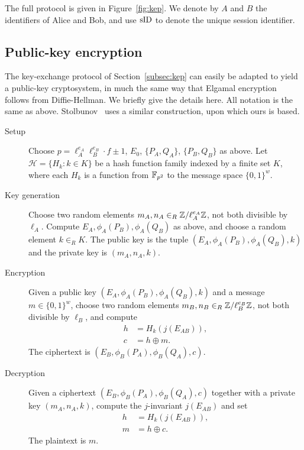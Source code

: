 The full protocol is given in Figure~\ref{fig:kep}. We denote by $A$
and $B$ the identifiers of Alice and Bob, and use $\operatorname{sID}$ to denote the
unique session identifier.

\subsection{Public-key encryption}\label{subsec:pk}

The key-exchange protocol of Section~\ref{subsec:kep} can easily be
adapted to yield a public-key cryptosystem, in much the same way that
Elgamal encryption follows from Diffie-Hellman. We briefly give the
details here. All notation is the same as above. Stolbunov~\cite{Stol}
uses a similar construction, upon which ours is based.

\begin{description}
\item[Setup] Choose $p = \ell_A^{e_A} \ell_B^{e_B} \cdot f \pm 1$,
  $E_0$, $\{P_A,Q_A\}$, $\{P_B,Q_B\}$ as above. Let $\mathcal{H} =
  \{H_k: k \in K\}$ be a hash function family indexed by a finite set
  $K$, where each $H_k$ is a function from ${\mathbb{F}}_{p^2}$ to the message
  space $\{0,1\}^w$.
\item[Key generation] Choose two random elements $m_A,n_A \in_R
{\mathbb{Z}}/\ell_A^{e_A}{\mathbb{Z}}$, not both divisible by $\ell_A$. Compute $E_A,
\phi_A(P_B), \phi_A(Q_B)$ as above, and choose a random element $k
\in_R K$. The public key is the tuple $(E_A, \phi_A(P_B), \phi_A(Q_B), k)$ and
the private key is $(m_A,n_A,k)$.
\item[Encryption] Given a public key $(E_A, \phi_A(P_B), \phi_A(Q_B),
  k)$ and a message $m \in \{0,1\}^w$, choose two random elements
  $m_B,n_B \in_R {\mathbb{Z}}/\ell_B^{e_B}{\mathbb{Z}}$, not both divisible by $\ell_B$,
  and compute
\begin{align*}
h &= H_k(j(E_{AB})), \\
c &= h \oplus m.
\end{align*}
The ciphertext is $(E_B, \phi_B(P_A), \phi_B(Q_A), c)$.
\item[Decryption] Given a ciphertext $(E_B, \phi_B(P_A), \phi_B(Q_A),
  c)$ together with a private key $(m_A,n_A,k)$, compute the $j$-invariant
  $j(E_{AB})$ and set
\begin{align*}
h &= H_k(j(E_{AB})), \\
m &= h \oplus c.
\end{align*}
The plaintext is $m$.
\end{description}

